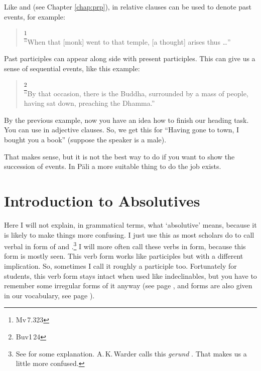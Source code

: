 Like  and  (see Chapter \ref{chap:prp}), in relative clauses  can be used to denote past events, for example:

\begin{quote}
\footnote{Mv\,7.323}\\
``When that [monk] went to that temple, [a thought] arises thus \ldots''\\
\end{quote}

Past participles can appear along side with present participles. This can give us a sense of sequential events, like this example:

\begin{quote}
\footnote{Buv1\,24}\\
``By that occasion, there is the Buddha, surrounded by a mass of people, having sat down, preaching the Dhamma.''\\
\end{quote}

By the previous example, now you have an idea how to finish our heading task. You can use  in adjective clauses. So, we get this for ``Having gone to town, I bought you a book'' (suppose the speaker is a male).


That makes sense, but it is not the best way to do if you want to show the succession of events. In P\=ali a more suitable thing to do the job exists.

\clearpage
{}
{}
\section*{Introduction to Absolutives}

Here I will not explain, in grammatical terms, what `absolutive' means, because it is likely to make things more confusing. I just use this as most scholars do to call verbal  in form of  and .\footnote{See \citealp[p.~114]{collins:grammar} for some explanation. A.\,K.\,Warder calls this \emph{gerund} \citep[p.~48]{warder:intro}. That makes us a little more confused.} I will more often call these verbs in  form, because this form is mostly seen. This verb form works like participles but with a different implication. So, sometimes I call it roughly a participle too. Fortunately for students, this verb form stays intact when used like indeclinables, but you have to remember some irregular forms of it anyway (see page \pageref{sec:irrprod}, and  forms are also given in our vocabulary, see page \pageref{vocab:verb}).


